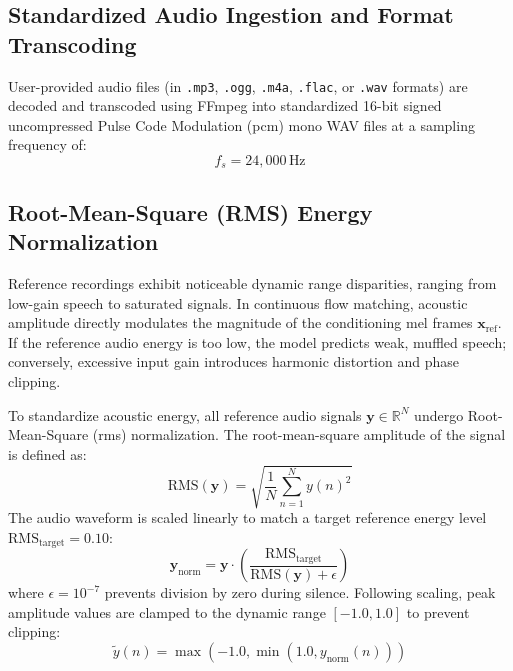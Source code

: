 \subsection{Standardized Audio Ingestion and Format Transcoding}
User-provided audio files (in \texttt{.mp3}, \texttt{.ogg}, \texttt{.m4a}, \texttt{.flac}, or \texttt{.wav} formats) are decoded and transcoded using FFmpeg into standardized 16-bit signed uncompressed Pulse Code Modulation (\gls{pcm}) mono WAV files at a sampling frequency of:
\begin{equation}
    f_s = 24,000\,\text{Hz}
    \label{eq:sampling_frequency}
\end{equation}

\subsection{Root-Mean-Square (RMS) Energy Normalization}
Reference recordings exhibit noticeable dynamic range disparities, ranging from low-gain speech to saturated signals. In continuous flow matching, acoustic amplitude directly modulates the magnitude of the conditioning mel frames $\mathbf{x}_{\text{ref}}$. If the reference audio energy is too low, the model predicts weak, muffled speech; conversely, excessive input gain introduces harmonic distortion and phase clipping.

To standardize acoustic energy, all reference audio signals $\mathbf{y} \in \mathbb{R}^{N}$ undergo Root-Mean-Square (\gls{rms}) normalization. The root-mean-square amplitude of the signal is defined as:
\begin{equation}
    \text{RMS}(\mathbf{y}) = \sqrt{\frac{1}{N} \sum_{n=1}^N y(n)^2}
    \label{eq:rms_definition}
\end{equation}
The audio waveform is scaled linearly to match a target reference energy level $\text{RMS}_{\text{target}} = 0.10$:
\begin{equation}
    \mathbf{y}_{\text{norm}} = \mathbf{y} \cdot \left( \frac{\text{RMS}_{\text{target}}}{\text{RMS}(\mathbf{y}) + \epsilon} \right)
    \label{eq:rms_scaling}
\end{equation}
where $\epsilon = 10^{-7}$ prevents division by zero during silence. Following scaling, peak amplitude values are clamped to the dynamic range $[-1.0, 1.0]$ to prevent clipping:
\begin{equation}
    \tilde{y}(n) = \max\left( -1.0, \min\left( 1.0, y_{\text{norm}}(n) \right) \right)
    \label{eq:clamping}
\end{equation}

